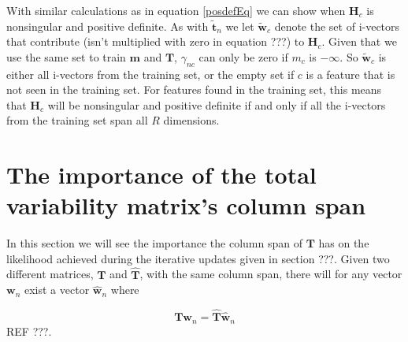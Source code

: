 With similar calculations as in equation \ref{posdefEq} we can show when $\mathbf{H}_c$ is nonsingular and positive definite. As with $\mathbf{\tilde{t}}_n$ we let $\mathbf{\tilde{w}}_c$ denote the set of i-vectors that contribute (isn't multiplied with zero in equation ???) to $\mathbf{H}_c$. Given that we use the same set to train $\mathbf{m}$ and $\mathbf{T}$, $\gamma_{nc}$ can only be zero if $m_c$ is $-\infty$. So $\mathbf{\tilde{w}}_c$ is either all i-vectors from the training set, or the empty set if $c$ is a feature that is not seen in the training set. For features found in the training set, this means that $\mathbf{H}_c$ will be nonsingular and positive definite if and only if all the i-vectors from the training set span all $R$ dimensions.

\section{The importance of the total variability matrix's column span}
\label{orthproof}

In this section we will see the importance the column span of $\mathbf{T}$ has on the likelihood achieved during the iterative updates given in section ???. Given two different matrices, $\mathbf{T}$ and $\mathbf{\hat{T}}$, with the same column span, there will for any vector $\mathbf{w}_n$ exist a vector $\mathbf{\hat{w}}_n$ where 

\begin{equation}
\label{colpropEq}
\mathbf{Tw}_n = \mathbf{\hat{T}\hat{w}}_n
\end{equation}
REF ???.
